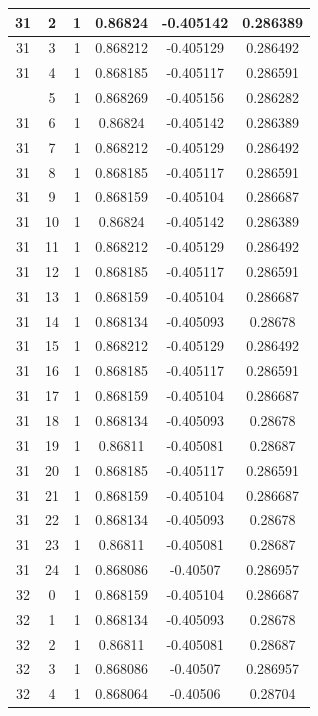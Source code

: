 \documentclass[12pt,a4paper]{article}
\numberwithin{equation}{section}
\numberwithin{figure}{section}
\numberwithin{table}{section}
\begin{document}
\begin{longtable}{|c|c|c|c|c|c|}
31 & 2 & 1 & 0.86824 & -0.405142 & 0.286389 \\ \hline
31 & 3 & 1 & 0.868212 & -0.405129 & 0.286492 \\ \hline
31 & 4 & 1 & 0.868185 & -0.405117 & 0.286591 \\ \hline
\pagebreak
31 & 5 & 1 & 0.868269 & -0.405156 & 0.286282 \\ \hline
31 & 6 & 1 & 0.86824 & -0.405142 & 0.286389 \\ \hline
31 & 7 & 1 & 0.868212 & -0.405129 & 0.286492 \\ \hline
31 & 8 & 1 & 0.868185 & -0.405117 & 0.286591 \\ \hline
31 & 9 & 1 & 0.868159 & -0.405104 & 0.286687 \\ \hline
31 & 10 & 1 & 0.86824 & -0.405142 & 0.286389 \\ \hline
31 & 11 & 1 & 0.868212 & -0.405129 & 0.286492 \\ \hline
31 & 12 & 1 & 0.868185 & -0.405117 & 0.286591 \\ \hline
31 & 13 & 1 & 0.868159 & -0.405104 & 0.286687 \\ \hline
31 & 14 & 1 & 0.868134 & -0.405093 & 0.28678 \\ \hline
31 & 15 & 1 & 0.868212 & -0.405129 & 0.286492 \\ \hline
31 & 16 & 1 & 0.868185 & -0.405117 & 0.286591 \\ \hline
31 & 17 & 1 & 0.868159 & -0.405104 & 0.286687 \\ \hline
31 & 18 & 1 & 0.868134 & -0.405093 & 0.28678 \\ \hline
31 & 19 & 1 & 0.86811 & -0.405081 & 0.28687 \\ \hline
31 & 20 & 1 & 0.868185 & -0.405117 & 0.286591 \\ \hline
31 & 21 & 1 & 0.868159 & -0.405104 & 0.286687 \\ \hline
31 & 22 & 1 & 0.868134 & -0.405093 & 0.28678 \\ \hline
31 & 23 & 1 & 0.86811 & -0.405081 & 0.28687 \\ \hline
31 & 24 & 1 & 0.868086 & -0.40507 & 0.286957 \\ \hline
32 & 0 & 1 & 0.868159 & -0.405104 & 0.286687 \\ \hline
32 & 1 & 1 & 0.868134 & -0.405093 & 0.28678 \\ \hline
32 & 2 & 1 & 0.86811 & -0.405081 & 0.28687 \\ \hline
32 & 3 & 1 & 0.868086 & -0.40507 & 0.286957 \\ \hline
32 & 4 & 1 & 0.868064 & -0.40506 & 0.28704 \\ \hline

\end{longtable}
\end{document}
